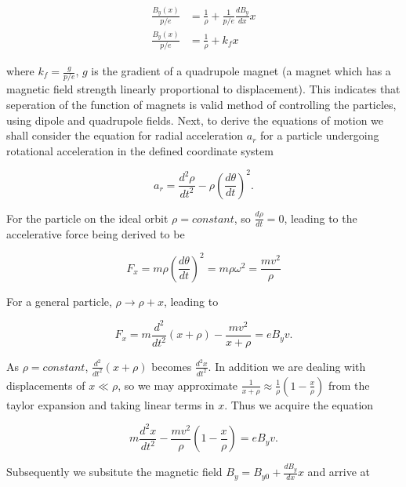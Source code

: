 \begin{align}
\frac{B_{y} \left( x \right)}{p/e} &= \frac{1}{\rho} + \frac{1}{p/e}\frac{dB_{y}}{dx} x \\
\frac{B_{y} \left( x \right)}{p/e} &= \frac{1}{\rho} + k_{f} x
\end{align}

where $k_{f} = \frac{g}{p/e}$, $g$ is the gradient of a quadrupole magnet (a magnet which has a magnetic field strength linearly proportional to displacement). This indicates that seperation of the function of magnets is valid method of controlling the particles, using dipole and quadrupole fields. Next, to derive the equations of motion we shall consider the equation for radial acceleration $a_{r}$ for a particle undergoing rotational acceleration in the defined coordinate system

\begin{equation}
a_{r} = \frac{d^{2}\rho}{dt^{2}} - \rho \left( \frac{d\theta}{dt} \right)^{2}.
\end{equation}

For the particle on the ideal orbit $\rho = constant$, so $\frac{d \rho}{dt} = 0$, leading to the accelerative force being derived to be

\begin{equation}
F_{x} = m \rho \left( \frac{d\theta}{dt} \right)^{2} = m\rho \omega^{2} = \frac{mv^{2}}{\rho}
\end{equation} 

For a general particle, $\rho \rightarrow \rho + x$, leading to

\begin{equation}
F_{x} = m\frac{d^{2}}{dt^{2}} \left( x+ \rho \right) - \frac{mv^{2}}{x + \rho} = eB_{y} v.
\end{equation}

As $\rho = constant$, $\frac{d^{2}}{dt^{2}} ( x+ \rho )$ becomes $\frac{d^{2}x}{dt^{2}}$. In addition we are dealing with displacements of $x \ll \rho$, so we may approximate $\frac{1}{x+\rho} \approx \frac{1}{\rho}(1-\frac{x}{\rho})$ from the taylor expansion and taking linear terms in $x$. Thus we acquire the equation

\begin{equation}
 m\frac{d^{2}x}{dt^{2}}  - \frac{mv^{2}}{\rho}\left( 1 - \frac{x}{\rho} \right) = eB_{y} v.
\end{equation}

Subsequently we subsitute the magnetic field $B_{y} = B_{y0} + \frac{dB_{y}}{dx} x$ and arrive at

